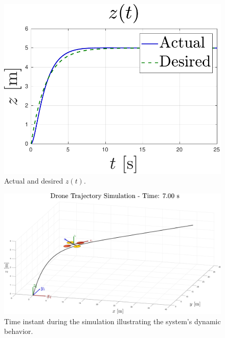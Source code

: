 \documentclass[main]{subfiles}
\begin{document}
\begin{figure}
\begin{minipage}[b]{0.45\textwidth}
        \label{fig:pid_y}
    \end{minipage}
    \begin{minipage}[b]{0.48\textwidth}
        \vspace{0.4cm}
        \centering
        \includegraphics[width=\textwidth]{images/pid_z.pdf}
        \caption[Tracking in Z-axis]{Actual and desired $z(t)$.}
        \label{fig:pid_z}
    \end{minipage}
\end{figure}

\begin{figure}
    \centering
    \includegraphics[width=\textwidth]{images/pid_sim.pdf}
    \caption[Simulation Overview]{Time instant during the simulation illustrating the system's dynamic behavior.}
    \label{fig:pid_sim}
\end{figure}
\end{document}
